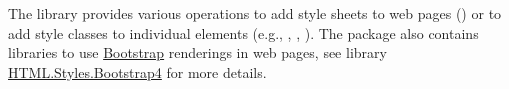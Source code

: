 The library  provides various operations to add
style sheets to web pages () or to add
style classes to individual elements
(e.g., , , ).
The package  also contains libraries
to use \href{https://getbootstrap.com/}{Bootstrap} renderings
in web pages, see library
\href{https://cpm.curry-lang.org/DOC/html2-3.5.0/HTML.Styles.Bootstrap4.html}{HTML.Styles.Bootstrap4}
for more details.


